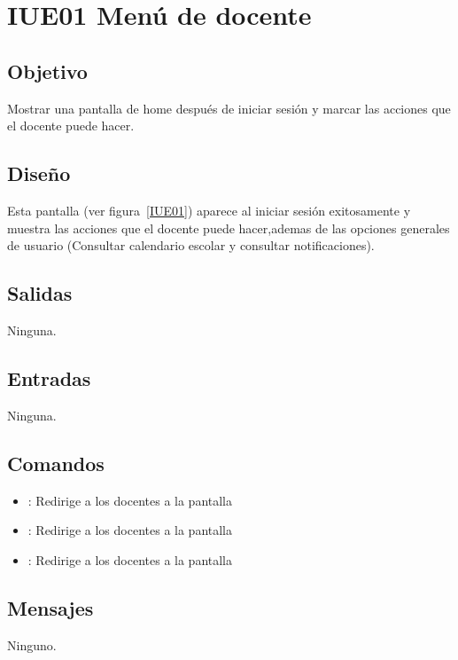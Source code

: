 \section{IUE01 Menú de docente}

\subsection{Objetivo}
	Mostrar una pantalla de home después de iniciar sesión y marcar las acciones que el docente puede hacer.

\subsection{Diseño}
	Esta pantalla  (ver figura~\ref{IUE01}) aparece al iniciar sesión exitosamente y muestra las acciones que el docente puede hacer,ademas de las opciones generales de usuario (Consultar calendario escolar y consultar notificaciones). 


\subsection{Salidas}

	Ninguna.

\subsection{Entradas}
	Ninguna.

\subsection{Comandos}
\begin{itemize}
	\item {}: Redirige a los docentes a la pantalla 
	\item {}: Redirige a los docentes a la pantalla 
	\item {}: Redirige a los docentes a la pantalla 
	
\end{itemize}

\subsection{Mensajes}

\begin{Citemize}
	\item Ninguno.
\end{Citemize}

